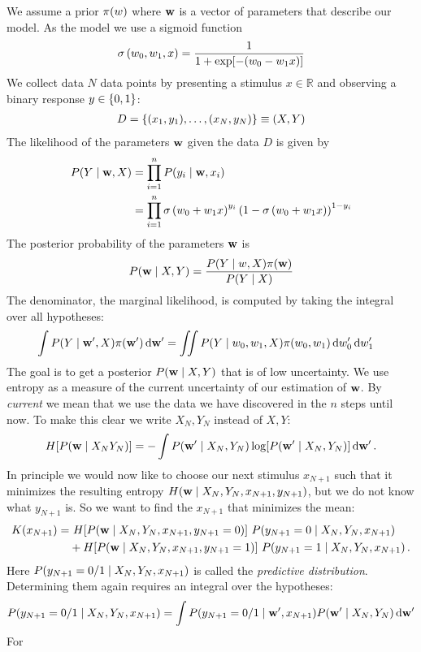 We assume a prior ${\pi(w)}$ where ${\bf w}$ is a vector of parameters that describe our model.
As the model we use a sigmoid function
\begin{align}
	{\sigma \left(w_0, w_1, x\right)} = \frac{1}{1 + \exp[-(w_0 - w_1 x)]}
\end{align}
We collect data $N$ data points by presenting a stimulus $x \in \mathbb{R}$ and observing a binary response $y \in \left\{ 0, 1 \right\}$:
\begin{align}
	 D = \left\{ (x_1, y_1), \dots, (x_N, y_N) \right\} \equiv (X, Y)
\end{align}
The likelihood of the parameters ${\bf w}$ given the data $D$ is given by
\begin{align}
	{P(Y \mid {\bf w}, X)}
	&= \prod_{i=1}^n {P(y_i \mid {\bf w}, x_i)} \\
	&= \prod_{i=1}^n {\sigma \left(w_0 + w_1 x\right)}^{y_i}
		\left( 1 - {\sigma \left(w_0 + w_1 x\right)} \right)^{1-y_i}
\end{align}
The posterior probability of the parameters ${\bf w}$ is
\begin{align}
	{P({\bf w} \mid X, Y)} = \frac{{P(Y \mid w, X)} {\pi({\bf w})}}{{P(Y \mid X)}}
\end{align}
The denominator, \ie the marginal likelihood, is computed by taking the integral over all hypotheses:
\begin{align}
	\int {P(Y \mid {\bf w}', X)} {\pi({\bf w}')} \,\mathrm{d} {\bf w}'
	&= \iint {P(Y \mid w_0, w_1, X)} {\pi(w_0, w_1)} \,\mathrm{d} w_0' \,\mathrm{d} w_1'
\end{align}
The goal is to get a posterior ${P({\bf w} \mid X, Y)}$ that is of low uncertainty. We use entropy as a measure of the current uncertainty of our estimation of ${\bf w}$. By \emph{current} we mean that we use the data we have discovered in the $n$ steps until now. To make this clear we write $X_N, Y_N$ instead of $X, Y$:
\begin{align}
	H[{P({\bf w} \mid X_N Y_N)}] = - \int {P({\bf w}' \mid X_N, Y_N)} \log[{P({\bf w}' \mid X_N, Y_N)}] \,\mathrm{d} {\bf w}' \,.
\end{align}
In principle we would now like to choose our next stimulus $x_{N+1}$ such that it minimizes the resulting entropy $H({\bf w} \mid X_N, Y_N, x_{N+1}, y_{N+1})$, but we do not know what $y_{N+1}$ is. So we want to find the $x_{N+1}$ that minimizes the mean:
\begin{align}
	K(x_{N+1}) =&~ H[{P({\bf w} \mid X_N, Y_N, x_{N+1}, y_{N+1} = 0)}] ~
	{P(y_{N+1} = 0 \mid X_N, Y_N, x_{N+1})} \\
	&+
	H[{P({\bf w} \mid X_N, Y_N, x_{N+1}, y_{N+1} = 1)}] ~
	{P(y_{N+1} = 1 \mid X_N, Y_N, x_{N+1})} \,.
\end{align}
Here ${P(y_{N+1} = 0/1 \mid X_N, Y_N, x_{N+1})}$ is called the \emph{predictive distribution}. Determining them again requires an integral over the hypotheses:
\begin{align}
	{P(y_{N+1} = 0/1 \mid X_N, Y_N, x_{N+1})}
	= \int {P(y_{N+1} = 0/1 \mid {\bf w}', x_{N+1})} {P({\bf w}' \mid X_N, Y_N)} \,\mathrm{d} {\bf w}'
\end{align}
For 

